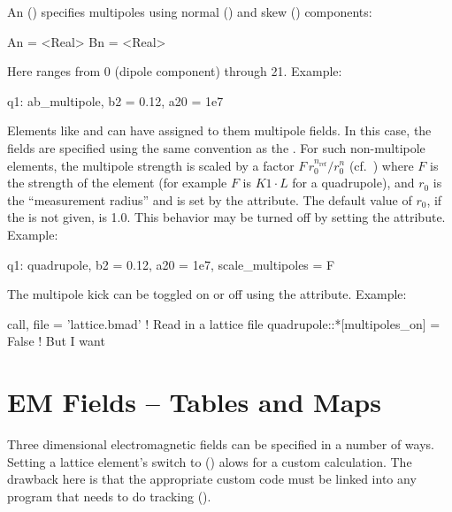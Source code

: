 An  () specifies multipoles using normal
() and skew () components:
\begin{example}
  An = <Real>
  Bn = <Real>
\end{example}
Here  ranges from 0 (dipole component) through 21. Example:
\begin{example}
  q1: ab_multipole, b2 = 0.12, a20 = 1e7
\end{example}

Elements like  and  can have assigned
to them multipole fields. In this case, the fields are specified using
the same convention as the .
For such non-multipole elements, the multipole strength is scaled by a
factor $F \, r_0^{n_\text{ref}} / r_0^n$ (cf.~) where $F$ is
the strength of the element (for example $F$ is $K1 \cdot L$ for a
quadrupole), and $r_0$ is the ``measurement radius'' and is set by the
 attribute. The default value of $r_0$, if the 
is not given, is 1.0.  This behavior may be turned off by setting the
 attribute.  Example:
\begin{example}
  q1: quadrupole, b2 = 0.12, a20 = 1e7, scale_multipoles = F
\end{example}

The multipole kick can be toggled on or off using the
 attribute. Example:
\begin{example}
  call, file = 'lattice.bmad'          ! Read in a lattice file
  quadrupole::*[multipoles_on] = False     ! But I want
\end{example}

\section{EM Fields -- Tables and Maps}
\label{s:em.fields}

Three dimensional electromagnetic fields can be specified in a number
of ways.  Setting a lattice element's  switch to
 () alows for a custom calculation. The
drawback here is that the appropriate custom code must be linked into
any program that needs to do tracking ().

